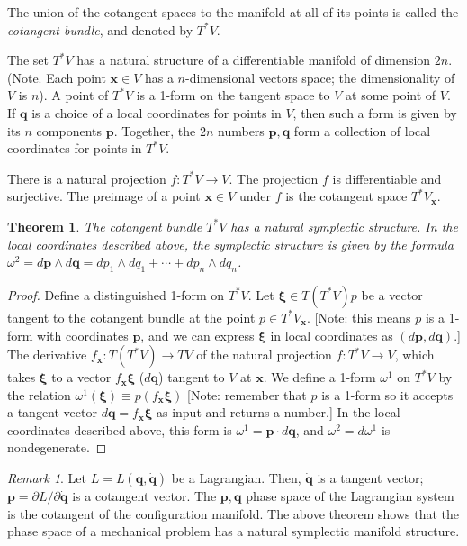 \documentclass{book}
\numberwithin{equation}{section}
\theoremstyle{plain}
\newtheorem*{thm*}{Theorem}
\theoremstyle{definition}
\theoremstyle{remark}
\newtheorem*{rem*}{Remark}
\theoremstyle{remark}
\begin{document}
The union of the cotangent spaces to the manifold at all of its points
is called the \emph{cotangent bundle}, and denoted by $T^*V$.

The set $T^*V$ has a natural structure of a differentiable manifold of
dimension $2 n$.
(Note. Each point $\mathbf x \in V$ has a $n$-dimensional vectors space;
the dimensionality of $V$ is $n$).
%
A point of $T^*V$ is a 1-form on the tangent space to $V$ at some point of $V$.
%
If $\mathbf q$ is a choice of a local coordinates for points in $V$,
then such a form is given by its $n$ components $\mathbf p$.
%
Together, the $2n$ numbers $\mathbf p, \mathbf q$ form a collection of local coordinates
for points in $T^*V$.


There is a natural projection
$f: T^*V \rightarrow V$.
%
The projection $f$ is differentiable and surjective.
%
The preimage of a point $\mathbf x \in V$ under $f$
is the cotangent space $T^*V_{\mathbf x}$.


\begin{thm*}
The cotangent bundle $T^*V$ has a natural symplectic structure.
%
In the local coordinates described above,
the symplectic structure is given by the formula
$\omega^2 = d\mathbf p \wedge d\mathbf q = dp_1 \wedge dq_1 + \cdots + dp_n \wedge dq_n$.
\end{thm*}

\begin{proof}
Define a distinguished 1-form on $T^*V$.
%
Let $\pmb \xi \in T(T^*V)p$ be a vector tangent to the cotangent bundle at
the point $p \in T^*V_{\mathbf x}$.
[Note: this means $p$ is a 1-form with coordinates $\mathbf p$,
and we can express $\pmb \xi$ in local coordinates as $(d\mathbf p, d\mathbf q)$.]
%
The derivative $f_{\mathbf x}: T(T^*V) \rightarrow TV$
of the natural projection $f: T^*V \rightarrow V$,
which takes $\pmb \xi$ to a vector $f_{\mathbf x} \pmb \xi$ ($d\mathbf q$)
tangent to $V$ at $\mathbf x$.
%
We define a 1-form $\omega^1$ on $T^*V$ by the relation
$\omega^1(\pmb \xi) \equiv p( f_{\mathbf x}\pmb \xi )$
[Note: remember that $p$ is a 1-form so it accepts
  a tangent vector $d\mathbf q = f_{\mathbf x} \pmb \xi$
as input and returns a number.]
%
In the local coordinates described above,
this form is
$\omega^1 = \mathbf p \cdot d\mathbf q$,
and
$\omega^2 = d\omega^1$ is nondegenerate.
\end{proof}

\begin{rem*}
Let $L = L(\mathbf q, \dot{\mathbf q})$  be a Lagrangian.
%
Then, $\dot{\mathbf q}$ is a tangent vector;
%
$\mathbf p = \partial L/\partial \dot{\mathbf q}$
is a cotangent vector.
%
The $\mathbf p, \mathbf q$ phase space of the Lagrangian system
is the cotangent of the configuration manifold.
%
The above theorem shows that the phase space of
a mechanical problem has a natural symplectic
manifold structure.
\end{rem*}
\end{document}
